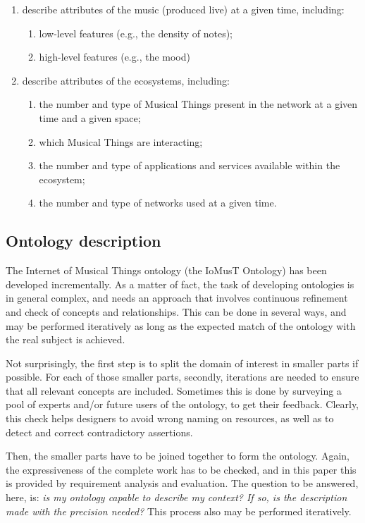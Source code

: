 \begin{multicols}{2}
\begin{enumerate}
\item describe attributes of the music (produced live) at a given time, including:
	\begin{enumerate}[wide, labelindent=0pt]
	\item low-level features (e.g., the density of notes);	
	\item high-level features (e.g., the mood)
	\end{enumerate}	
	
\item describe attributes of the ecosystems, including:
	\begin{enumerate}[wide, labelindent=0pt]
	\item the number and type of Musical Things present in the network at a given time and a given space;
	\item which Musical Things are interacting;
	\item the number and type of applications and services available within the ecosystem; 
	\item the number and type of networks used at a given time.
	\end{enumerate}	

\end{enumerate}
\end{multicols}

\subsection{Ontology description}
\label{ssec:description}
The Internet of Musical Things ontology (the IoMusT Ontology) has been developed incrementally. As a matter of fact, the task of developing ontologies is in general complex, and needs an approach that involves continuous refinement and check of concepts and relationships. This can be done in several ways, and may be performed iteratively as long as the expected match of the ontology with the real subject is achieved. 

Not surprisingly, the first step is to split the domain of interest in smaller parts if possible. For each of those smaller parts, secondly, iterations are needed to ensure that all relevant concepts are included. Sometimes this is done by surveying a pool of experts and/or future users of the ontology, to get their feedback. Clearly, this check helps designers to avoid wrong naming on resources, as well as to detect and correct contradictory assertions.

Then, the smaller parts have to be joined together to form the ontology. Again, the expressiveness of the complete work has to be checked, and in this paper this is provided by requirement analysis and evaluation. The question to be answered, here, is: \textit{is my ontology capable to describe my context? If so, is the description made with the precision needed?} This process also may be performed iteratively.

